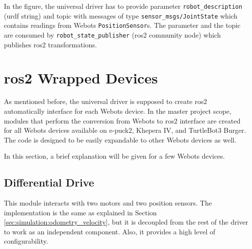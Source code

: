 In the figure, the universal driver has to provide parameter \texttt{robot\_description} (\ac{urdf} string) and topic with messages of type \texttt{sensor\_msgs/JointState} which contains readings from Webots \texttt{PositionSensor}s. The parameter and the topic are consumed by \texttt{robot\_state\_publisher} (\ac{ros2} community node) which publishes \ac{ros2} transformations.

\section{\ac{ros2} Wrapped Devices}
As mentioned before, the universal driver is supposed to create \ac{ros2} automatically interface for each Webots device. In the master project scope, modules that perform the conversion from Webots to \ac{ros2} interface are created for all Webots devices available on e-puck2, Khepera IV, and TurtleBot3 Burger. The code is designed to be easily expandable to other Webots devices as well.

In this section, a brief explanation will be given for a few Webots devices.

\subsection{Differential Drive}
This module interacts with two motors and two position sensors. The implementation is the same as explained in Section \ref{sec:simulation:odometry_velocity}, but it is decoupled from the rest of the driver to work as an independent component. Also, it provides a high level of configurability.

